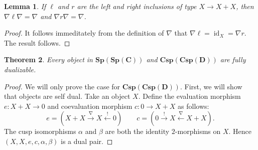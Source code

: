 \documentclass[11pt]{amsart}
\newcommand{\from}{\colon}
\newcommand{\xto}[1]{\xrightarrow{#1}}
\newcommand{\bispsp}[1]{\mathbf{Sp(Sp(#1))}}
\newcommand{\bicspcsp}[1]{\mathbf{Csp(Csp(#1))}}
\DeclareMathOperator{\id}{id}
\newtheorem{thm}{Theorem}[section]
\newtheorem{lem}[thm]{Lemma}
\theoremstyle{remark}
\theoremstyle{definition}
\begin{document}
\begin{lem}
	If $\ell$ and $r$ are the left and right inclusions of type $X \to X+X$, then $\nabla \ell \nabla = \nabla$ and $\nabla r \nabla = \nabla$.
\end{lem}

\begin{proof}
	It follows immeditately from the definition of $\nabla$ that $\nabla \ell = \id_X = \nabla r$.  The result follows.  
\end{proof}

\begin{thm}
	\label{thm:SpansSpansAreFullyDualBicat}
	Every object in $\bispsp{C}$ and $\bicspcsp{D}$ are fully dualizable.
\end{thm}

\begin{proof}
	We will only prove the case for $\bicspcsp{D}$.  First, we will show that objects are self dual.  Take an object $X$. Define the evaluation morphism $e \from X+X \to 0$ and coevaluation morphism $c \from 0 \to X+X$ as follows:
	\[
		e = (X+X \xto{\nabla} X \xleftarrow{!} 0)
		\quad \quad
		c = (0 \xto{!} X \xleftarrow{\nabla} X+X ).
	\]
	The cusp isomorphisms $\alpha$ and $\beta$ are both the identity $2$-morphisms on $X$. Hence $(X,X,e,c,\alpha,\beta)$ is a dual pair.
	

\end{proof}
\end{document}
